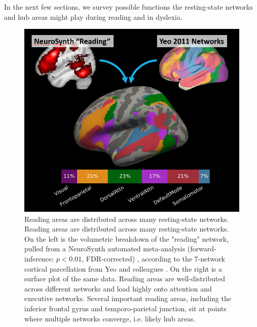 In the next few sections, we survey possible functions the resting-state networks and hub areas might play during reading and in dyslexia.  

\begin{figure}
\centering
\includegraphics[width=5in]{images/ch1-yeo-to-neurosynth.png}
    \caption{Reading areas are distributed across many resting-state networks. Reading areas are distributed across many resting-state networks. On the left is the volumetric breakdown of the "reading" network, pulled from a NeuroSynth automated meta-analysis (forward-inference: $p < 0.01$, FDR-corrected) \citep{Yarkoni2011}, according to the 7-network cortical parcellation from Yeo and colleagues \citep{Yeo2011}. On the right is a surface plot of the same data. Reading areas are well-distributed across different networks and load highly onto attention and executive networks. Several important reading areas, including the inferior frontal gyrus and temporo-parietal junction, sit at points where multiple networks converge, i.e. likely hub areas.}
    \label{fig:ch1-yeo-to-neurosynth}
\end{figure}

